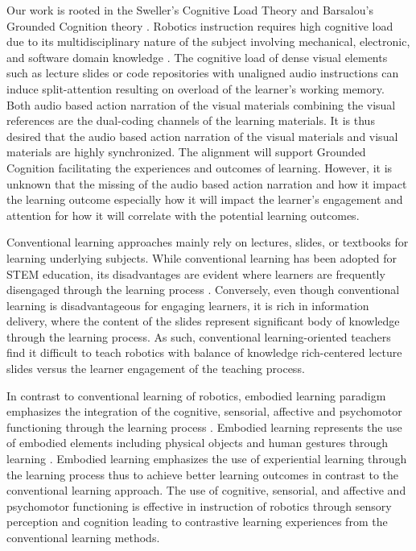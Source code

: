 \documentclass[fleqn,10pt]{JLA_article} %
\begin{document}
Our work is rooted in the Sweller's Cognitive Load Theory and Barsalou's Grounded Cognition theory \cite{van2005cognitive}. Robotics instruction requires high cognitive load due to its multidisciplinary nature of the subject involving mechanical, electronic, and software domain knowledge \cite{kert2026innovative,paas2004cognitive}. The cognitive load of dense visual elements such as lecture slides or code repositories with unaligned audio instructions can induce split-attention resulting on overload of the learner's working memory. Both audio based action narration of the visual materials combining the visual references are the dual-coding channels of the learning materials. It is thus desired that the audio based action narration of the visual materials and visual materials are highly synchronized. The alignment will support Grounded Cognition facilitating the experiences and outcomes of learning. However, it is unknown that the missing of the audio based action narration and how it impact the learning outcome especially how it will impact the learner's engagement and attention for how it will correlate with the potential learning outcomes.

Conventional learning approaches mainly rely on lectures, slides, or textbooks for learning underlying subjects. While conventional learning has been adopted for STEM education, its disadvantages are evident where learners are frequently disengaged through the learning process \cite{freeman2014active}. Conversely, even though conventional learning is disadvantageous for engaging learners, it is rich in information delivery, where the content of the slides represent significant body of knowledge through the learning process. As such, conventional learning-oriented teachers find it difficult to teach robotics with balance of knowledge rich-centered lecture slides versus the learner engagement of the teaching process.

In contrast to conventional learning of robotics, embodied learning paradigm emphasizes the integration of the cognitive, sensorial, affective and psychomotor functioning through the learning process \cite{jusslin2022embodied}. Embodied learning represents the use of embodied elements including physical objects and human gestures through learning \cite{stolz2015embodied,macedonia2019embodied,munro2018principles}. Embodied learning emphasizes the use of experiential learning through the learning process thus to achieve better learning outcomes in contrast to the conventional learning approach. The use of cognitive, sensorial, and affective and psychomotor functioning is effective in instruction of robotics through sensory perception and cognition leading to contrastive learning experiences from the conventional learning methods.
\end{document}
